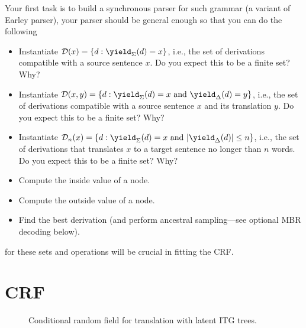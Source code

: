 Your first task is to build a synchronous parser for such grammar (a variant of Earley parser), your parser should be general enough so that you can do the following
\begin{itemize}
	\item Instantiate $\mathcal D( x) = \{ d: \yield_\Sigma( d) =  x\}$, i.e., the set of derivations compatible with a source sentence $x$. Do you expect this to be a finite set? Why?
	\item Instantiate $\mathcal D( x,  y) = \{ d: \yield_\Sigma( d) =  x \text{ and } \yield_\Delta( d) =  y\}$, i.e., the set of derivations compatible with a source sentence $ x$ and its translation $ y$. Do you expect this to be a finite set? Why?
	\item Instantiate $\mathcal D_n( x) = \{ d: \yield_\Sigma( d) =  x \text{ and } |\yield_\Delta(d)| \le n\}$, i.e., the set of derivations that translates $x$ to a target sentence no longer than $n$ words. Do you expect this to be a finite set? Why?
	 \item Compute the inside value of a node.
	 \item Compute the outside value of a node.
	 \item Find the best derivation (and perform ancestral sampling---see optional MBR decoding below).
\end{itemize}
for these sets and operations will be crucial in fitting the CRF.

\section{CRF}

\begin{center}
\begin{figure}[h]\centering
\caption{Conditional random field for translation with latent ITG trees.}
\end{figure}
\end{center}



